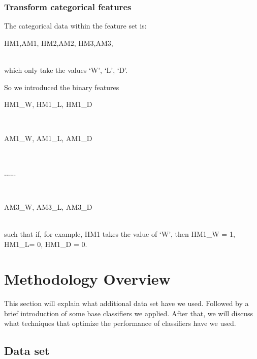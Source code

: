 \documentclass{article}
\begin{document}
\subsubsection{Transform categorical features}
The categorical data within the feature set is: \\
		\centerline{HM1,AM1, HM2,AM2, HM3,AM3, }\\
which only take the values {‘W’, ‘L’, ‘D’}.

So we introduced the binary features		\\
\centerline{HM1\_W, HM1\_L, HM1\_D}	\\
\centerline{AM1\_W, AM1\_L, AM1\_D}		\\	
\centerline{......}		\\
\centerline{AM3\_W, AM3\_L, AM3\_D}		\\
such that if, for example, HM1 takes the value of ‘W’,  then HM1\_W = 1, HM1\_L= 0, HM1\_D = 0. 

\section{Methodology Overview}
This section will explain what additional data set have we used. Followed by a brief introduction of some base classifiers we applied. After that, we will discuss what techniques that optimize the performance of classifiers have we used. \\



\subsection{Data set}
\end{document}
